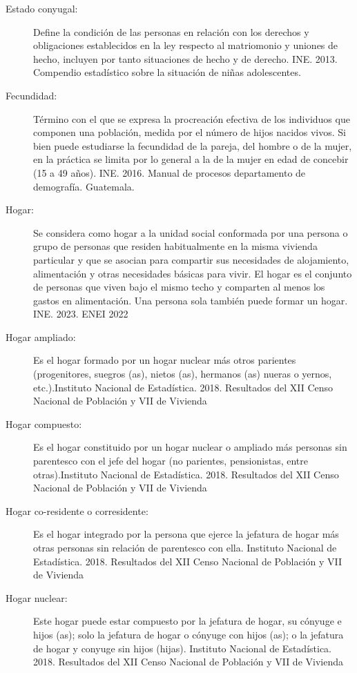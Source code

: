 \begin{description}
	\item[Estado conyugal:] Define la condición de las personas en relación con los derechos y obligaciones establecidos en la ley respecto al matriomonio y uniones de hecho, incluyen por tanto situaciones de hecho y de derecho. INE. 2013.  Compendio estadístico sobre la situación de niñas adolescentes.
	\item[Fecundidad:] Término con el que se expresa la procreación efectiva de los individuos que componen una población, medida por el número de hijos nacidos vivos. Si bien puede estudiarse la fecundidad de la pareja, del hombre o de la mujer, en la práctica se limita por lo general a la de la mujer en edad de concebir (15 a 49 años). INE. 2016. Manual de procesos departamento de demografía. Guatemala.
	\item[Hogar:] Se considera como hogar a la unidad social conformada por una persona o grupo de personas que residen habitualmente en la misma vivienda particular y que se asocian para compartir sus necesidades de alojamiento, alimentación y otras necesidades básicas para vivir. El hogar es el conjunto de personas que viven bajo el mismo techo y comparten al menos los gastos en alimentación. Una persona sola también puede formar un hogar. INE. 2023. ENEI 2022
	\item[Hogar ampliado:] Es el hogar formado por un hogar nuclear más otros parientes (progenitores, suegros (as), nietos (as), hermanos (as) nueras o yernos, etc.).Instituto Nacional de Estadística. 2018. Resultados del XII Censo Nacional de Población y VII de Vivienda
	\item[Hogar compuesto:] Es el hogar constituido por un hogar nuclear o ampliado más personas sin parentesco con el jefe del hogar (no parientes, pensionistas, entre otras).Instituto Nacional de Estadística. 2018. Resultados del XII Censo Nacional de Población y VII de Vivienda
     	\item[Hogar co-residente o corresidente:] Es el hogar integrado por la persona que ejerce la jefatura de hogar más otras personas sin relación de parentesco con ella. Instituto Nacional de Estadística. 2018. Resultados del XII Censo Nacional de Población y VII de Vivienda
        \item[Hogar nuclear:] Este hogar puede estar compuesto por la jefatura de hogar, su cónyuge e hijos (as); solo la jefatura de hogar o cónyuge con hijos (as); o la jefatura de hogar y conyuge sin hijos (hijas). Instituto Nacional de Estadística. 2018. Resultados del XII Censo Nacional de Población y VII de Vivienda

\end{description}

